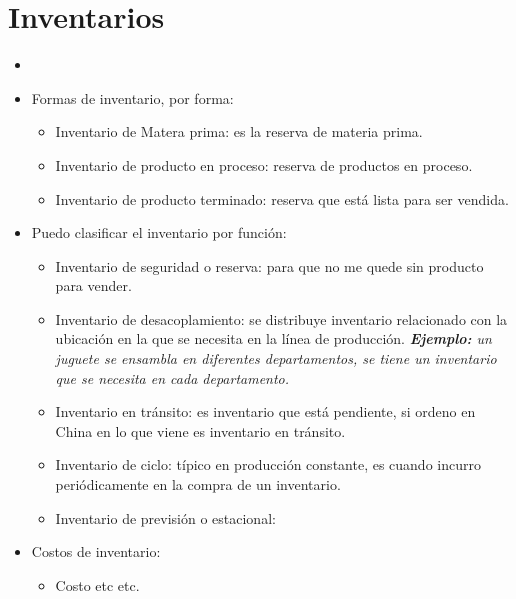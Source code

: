 \section{Inventarios}
\begin{itemize}
    \item {}
    \item Formas de inventario, por forma:
        \begin{itemize}
            \item Inventario de Matera prima: es la reserva de materia prima.
            \item Inventario de producto en proceso: reserva de productos en proceso.
            \item Inventario de producto terminado: reserva que está lista para ser vendida.
        \end{itemize}
    
    \item Puedo clasificar el inventario por función:
        \begin{itemize}
            \item Inventario de seguridad o reserva: para que no me quede sin producto para vender.
            \item Inventario de desacoplamiento: se distribuye inventario relacionado con la ubicación en la que se necesita en la línea de producción. \emph{\textbf{Ejemplo: }un juguete se ensambla en diferentes departamentos, se tiene un inventario que se necesita en cada departamento.}
            \item Inventario en tránsito: es inventario que está pendiente, si ordeno en China en lo que viene es inventario en tránsito.
            \item Inventario de ciclo: típico en producción constante, es cuando incurro periódicamente en la compra de un inventario.
            \item Inventario de previsión o estacional: 
        \end{itemize}
    
    \item Costos de inventario: 
        \begin{itemize}
            \item Costo etc etc.
        \end{itemize}
    

\end{itemize}
